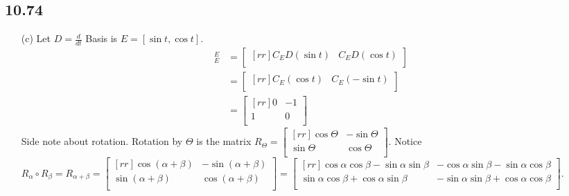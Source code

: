 \documentclass{report}
\begin{document}
\subsection{10.74}
\begin{enumerate}
\item[(c)] Let $D=\frac{d}{dt}$ Basis is $E=[\sin t, \cos t]$.\\
\begin{align*}
	[D]_E^E &=\begin{bmatrix}[rr]C_ED(\sin t) & C_ED(\cos t)\\\end{bmatrix}\\
	&=\begin{bmatrix}[rr]C_E(\cos t) & C_E(-\sin t)\\\end{bmatrix}\\
	&=\begin{bmatrix}[rr]0&-1\\1&0\\\end{bmatrix}
\end{align*}
Side note about rotation. Rotation by $\Theta$ is the matrix $R_\Theta = \begin{bmatrix}[rr]\cos\Theta & -\sin\Theta\\\sin\Theta & \cos\Theta\\\end{bmatrix}$. Notice $R_\alpha \circ R_\beta = R_{\alpha + \beta} = \begin{bmatrix}[rr]\cos (\alpha + \beta) & -\sin (\alpha + \beta)\\\sin (\alpha + \beta) & \cos (\alpha + \beta)\\\end{bmatrix} = \begin{bmatrix}[rr]\cos\alpha\cos\beta - \sin\alpha\sin\beta & -\cos\alpha\sin\beta-\sin\alpha\cos\beta\\\sin\alpha\cos\beta + \cos\alpha\sin\beta & -\sin\alpha\sin\beta + \cos\alpha\cos\beta\\\end{bmatrix}$.
\end{enumerate}
\end{document}
